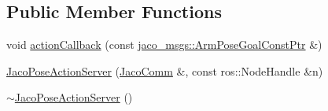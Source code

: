 \subsection*{Public Member Functions}
\begin{DoxyCompactItemize}
\item 
void \hyperlink{classjaco_1_1JacoPoseActionServer_a82396bb5f219f54518a80493bfd38f26}{action\+Callback} (const \hyperlink{namespacejaco__msgs_ab8464776109924758c47fab6ce179567}{jaco\+\_\+msgs\+::\+Arm\+Pose\+Goal\+Const\+Ptr} \&)
\item 
\hyperlink{classjaco_1_1JacoPoseActionServer_aadc62df5a70d28ec54c90ceeec00fbe3}{Jaco\+Pose\+Action\+Server} (\hyperlink{classjaco_1_1JacoComm}{Jaco\+Comm} \&, const ros\+::\+Node\+Handle \&n)
\item 
\hyperlink{classjaco_1_1JacoPoseActionServer_ab1c488f56f4759f917c46406230e6c84}{$\sim$\+Jaco\+Pose\+Action\+Server} ()
\end{DoxyCompactItemize}
